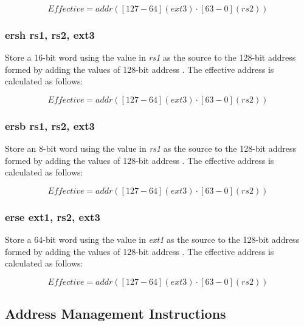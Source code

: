 \documentclass{article}
\begin{document}
\begin{equation}
Effective = addr([127-64](ext3) \cdot [63-0](rs2))
\end{equation}

\subsubsection{ersh rs1, rs2, ext3}

Store a 16-bit word using the value in \textit{rs1} as the source 
to the 128-bit address formed by adding the values of
128-bit address .  The effective address is calculated 
as follows: 

\begin{equation}
Effective = addr([127-64](ext3) \cdot [63-0](rs2))
\end{equation}

\subsubsection{ersb rs1, rs2, ext3}

Store an 8-bit word using the value in \textit{rs1} as the source 
to the 128-bit address formed by adding the values of
128-bit address .  The effective address is calculated 
as follows: 

\begin{equation}
Effective = addr([127-64](ext3) \cdot [63-0](rs2))
\end{equation}

\subsubsection{erse ext1, rs2, ext3}

Store a 64-bit word using the value in \textit{ext1} as the source 
to the 128-bit address formed by adding the values of
128-bit address .  The effective address is calculated 
as follows: 

\begin{equation}
Effective = addr([127-64](ext3) \cdot [63-0](rs2))
\end{equation}

\subsection{Address Management Instructions}
\label{sec:AddressManagementInstructions}
\end{document}
